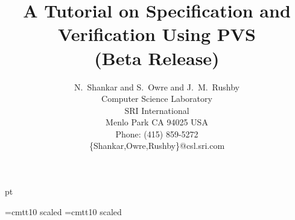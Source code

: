 \sloppy

%

\newcommand{\allttinput}[1]{\hozline{\smaller\smaller\smaller\begin{alltt}\end{alltt}}\hozline}
\newenvironment{pvsscript}{\hozline\smaller\smaller\smaller\begin{alltt}}{\end{alltt}\hozline}

\topmargin -10pt
\textheight 8.5in
\textwidth 6.0in
 pt
\columnwidth \textwidth
\oddsidemargin 0.5in
\evensidemargin 0.5in   %
\setcounter{topnumber}{9}
\renewcommand{\topfraction}{.99}
\setcounter{bottomnumber}{9}
\renewcommand{\bottomfraction}{.99}
\setcounter{totalnumber}{10}
\renewcommand{\textfraction}{.01}
\renewcommand{\floatpagefraction}{.01}

\raggedbottom

\font\largett=cmtt10 scaled
\font\hugett=cmtt10 scaled
\def\opt{{\smaller\sc {\smaller\smaller \&}optional}}
\def\rest{{\smaller\sc {\smaller\smaller \&}rest}}
\def\default#1{[\,{\tt #1}] }
\def\bkt#1{{$\langle$#1$\rangle$}}

\newenvironment{usage}[1]{\item[usage:\hspace*{-0.175in}]#1\begin{description}\setlength{\itemindent}{-0.2in}\setlength{\itemsep}{0.1in}}{\end{description}}


\pagestyle{empty}
\title{\Large\bf A Tutorial on Specification and Verification Using
PVS\\(Beta Release)}
\author{N.~Shankar and S.~Owre and J.~M.~Rushby\\Computer Science Laboratory\\SRI International\\
Menlo Park CA 94025 USA\\
Phone: (415) 859-5272\\
\{Shankar,Owre,Rushby\}@csl.sri.com}


